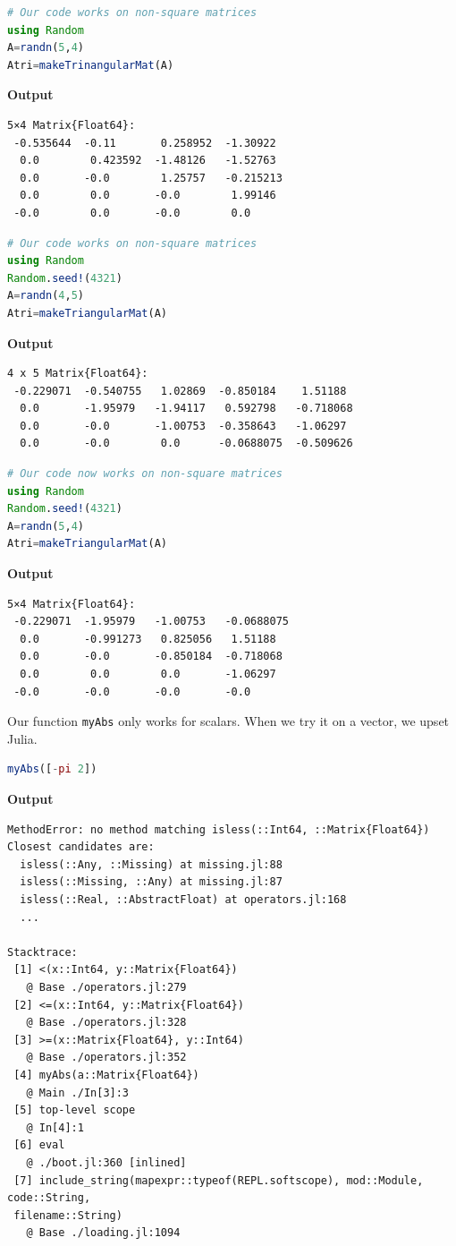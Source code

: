 \begin{lstlisting}[language=Julia,style=mystyle]
# Our code works on non-square matrices
using Random
A=randn(5,4)
Atri=makeTrinangularMat(A)
\end{lstlisting}
\textbf{Output} 
\begin{verbatim}
5×4 Matrix{Float64}:
 -0.535644  -0.11       0.258952  -1.30922
  0.0        0.423592  -1.48126   -1.52763
  0.0       -0.0        1.25757   -0.215213
  0.0        0.0       -0.0        1.99146
 -0.0        0.0       -0.0        0.0
\end{verbatim}


\begin{lstlisting}[language=Julia,style=mystyle]
# Our code works on non-square matrices
using Random
Random.seed!(4321)
A=randn(4,5)
Atri=makeTriangularMat(A)
\end{lstlisting}
\textbf{Output} 
\begin{verbatim}
4 x 5 Matrix{Float64}:
 -0.229071  -0.540755   1.02869  -0.850184    1.51188
  0.0       -1.95979   -1.94117   0.592798   -0.718068
  0.0       -0.0       -1.00753  -0.358643   -1.06297
  0.0       -0.0        0.0      -0.0688075  -0.509626
\end{verbatim}


\begin{lstlisting}[language=Julia,style=mystyle]
# Our code now works on non-square matrices
using Random
Random.seed!(4321)
A=randn(5,4)
Atri=makeTriangularMat(A)
\end{lstlisting}
\textbf{Output} 
\begin{verbatim}
5×4 Matrix{Float64}:
 -0.229071  -1.95979   -1.00753   -0.0688075
  0.0       -0.991273   0.825056   1.51188
  0.0       -0.0       -0.850184  -0.718068
  0.0        0.0        0.0       -1.06297
 -0.0       -0.0       -0.0       -0.0
\end{verbatim}



Our function \texttt{myAbs} only works for scalars. When we try it on a vector, we upset Julia.\\

\begin{lstlisting}[language=Julia,style=mystyle]
myAbs([-pi 2])
\end{lstlisting}
\textbf{Output} 
\begin{verbatim}
MethodError: no method matching isless(::Int64, ::Matrix{Float64})
Closest candidates are:
  isless(::Any, ::Missing) at missing.jl:88
  isless(::Missing, ::Any) at missing.jl:87
  isless(::Real, ::AbstractFloat) at operators.jl:168
  ...

Stacktrace:
 [1] <(x::Int64, y::Matrix{Float64})
   @ Base ./operators.jl:279
 [2] <=(x::Int64, y::Matrix{Float64})
   @ Base ./operators.jl:328
 [3] >=(x::Matrix{Float64}, y::Int64)
   @ Base ./operators.jl:352
 [4] myAbs(a::Matrix{Float64})
   @ Main ./In[3]:3
 [5] top-level scope
   @ In[4]:1
 [6] eval
   @ ./boot.jl:360 [inlined]
 [7] include_string(mapexpr::typeof(REPL.softscope), mod::Module, code::String,
 filename::String)
   @ Base ./loading.jl:1094
\end{verbatim}

